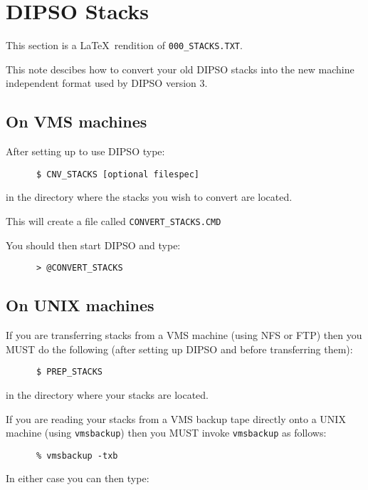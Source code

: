 \newpage

\section{DIPSO Stacks}

This section is a \LaTeX\ rendition of {\tt 000\_STACKS.TXT}.

This note descibes how to convert your old DIPSO stacks into
the new machine independent format used by DIPSO version 3.

\subsection{On VMS machines}

After setting up to use DIPSO type:

\begin{verbatim}
      $ CNV_STACKS [optional filespec]
\end{verbatim}

in the directory where the stacks you wish to convert
are located.

This will create a file called {\tt CONVERT\_STACKS.CMD}

You should then start DIPSO and type:

\begin{verbatim}
      > @CONVERT_STACKS
\end{verbatim}

\subsection{On UNIX machines}

If you are transferring stacks from a VMS machine (using NFS or FTP)
then you MUST do the following (after setting up DIPSO and 
before transferring them):

\begin{verbatim}
      $ PREP_STACKS
\end{verbatim}

in the directory where your stacks are located.

If you are reading your stacks from a VMS backup tape directly onto
a UNIX machine (using {\tt vmsbackup}) then you MUST invoke {\tt vmsbackup}
as follows:

\begin{verbatim}
      % vmsbackup -txb
\end{verbatim}

In either case you can then type:


